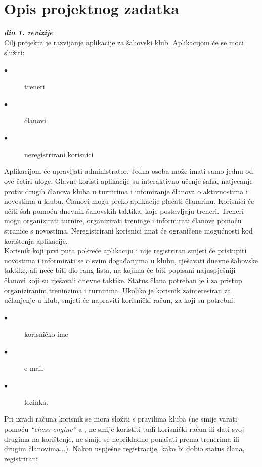 \chapter{Opis projektnog zadatka}
		
		\textbf{\textit{dio 1. revizije}}\\
		    Cilj projekta je razvijanje aplikacije za šahovski klub. Aplikacijom će
			se moći služiti:
			
			\begin{description}
				\item[$\bullet$] treneri 
				\item[$\bullet$] članovi
				\item[$\bullet$] neregistrirani korisnici
			\end{description} 
		    Aplikacijom će upravljati administrator. Jedna osoba može imati samo jednu od ove
			četiri uloge. Glavne koristi aplikacije su interaktivno učenje šaha,
			natjecanje protiv drugih članova kluba u turnirima i infomiranje članova
			o aktivnostima i novostima u klubu. Članovi mogu preko aplikacije plaćati članarinu. Korisnici će učiti šah pomoću dnevnih šahovskih
			taktika, koje postavljaju treneri. Treneri mogu organizirati turnire,
			organizirati treninge i informirati članove pomoću stranice s novostima.
			Neregistrirani korisnici imat će ograničene mogućnosti kod korištenja
			aplikacije. \\
		    Korisnik koji prvi puta pokreće aplikaciju i nije registriran smjeti će
			pristupiti novostima i informirati se o svim događanjima u klubu,
			rješavati dnevne šahovske taktike, ali neće biti dio rang lista, na
			kojima će biti popisani najuspješniji članovi koji su rješavali dnevne
			taktike. Status člana potreban je i za pristup organiziranim treninzima
			i turnirima. Ukoliko je korisnik zainteresiran za učlanjenje u klub,
			smjeti će napraviti korisnički račun, za koji su potrebni:
			\begin{description}
			\item[$\bullet$] korisničko ime
			\item[$\bullet$] e-mail
			\item[$\bullet$] lozinka. 
	    	\end{description} 
			Pri izradi računa korisnik se mora složiti s
			pravilima kluba (ne smije varati pomoću \textit{``chess engine''}-a , ne smije
			koristiti tuđi korisnički račun ili dati svoj drugima na korištenje, ne
			smije se neprikladno ponašati prema trenerima ili drugim članovima...).
			Nakon uspješne registracije, kako bi dobio status člana, registrirani
